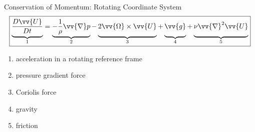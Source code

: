 \begin{frame}{Conservation of Momentum: Rotating Coordinate System}
$$\boxed{\underbrace{\vphantom{-\frac{1}{\rho}\vv{\nabla}p}\frac{D\vv{U}}{Dt}}_{1} = \underbrace{-\frac{1}{\rho}\vv{\nabla}p}_{2} - \underbrace{\vphantom{-\frac{1}{\rho}\vv{\nabla}p}2\vv{\Omega}\times \vv{U}}_{3} + \underbrace{\vphantom{-\frac{1}{\rho}\vv{\nabla}p}\vv{g}}_{4} + \underbrace{\vphantom{-\frac{1}{\rho}\vv{\nabla}p}\nu \vv{\nabla}^2\vv{U}}_{5}}$$
\begin{enumerate}
	\item acceleration in a rotating reference frame
	\item pressure gradient force
	\item Coriolis force
	\item gravity
	\item friction
\end{enumerate}
\end{frame}


